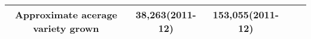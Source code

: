 \documentclass[]{article}
\begin{document}
\begin{longtable}[]{@{}ccccc@{}}
\begin{minipage}[t]{0.06\columnwidth}
Approximate acerage variety grown\strut
\end{minipage} & \begin{minipage}[t]{0.08\columnwidth}\centering\strut
38,263(2011-12)\strut
\end{minipage} & \begin{minipage}[t]{0.11\columnwidth}\centering\strut
153,055(2011-12)\strut
\end{minipage} & \begin{minipage}[t]{0.08\columnwidth}\centering\strut
\strut
\end{minipage} & \begin{minipage}[t]{0.12\columnwidth}\centering\strut
\strut
\end{minipage}\tabularnewline
\bottomrule
\end{longtable}
\end{document}
